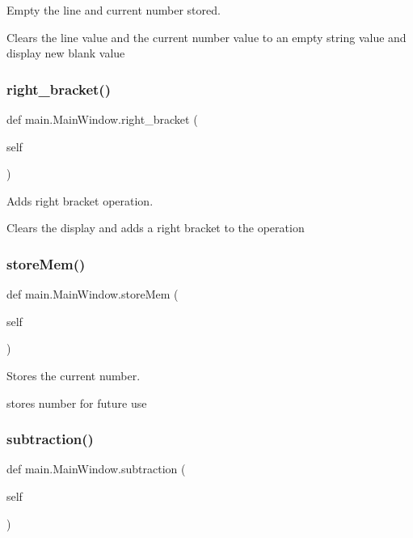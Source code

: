 Empty the line and current number stored. 

Clears the line value and the current number value to an empty string value and display new blank value \mbox{\label{classmain_1_1_main_window_a5685744d7001c36a299b5e7ce984cf92}} 
\subsubsection{\texorpdfstring{right\+\_\+bracket()}{right\_bracket()}}
{\footnotesize\ttfamily def main.\+Main\+Window.\+right\+\_\+bracket (\begin{DoxyParamCaption}\item[{}]{self }\end{DoxyParamCaption})}



Adds right bracket operation. 

Clears the display and adds a right bracket to the operation \mbox{\label{classmain_1_1_main_window_a0888a2f2c8cd534806ea385502f1a67b}} 
\subsubsection{\texorpdfstring{store\+Mem()}{storeMem()}}
{\footnotesize\ttfamily def main.\+Main\+Window.\+store\+Mem (\begin{DoxyParamCaption}\item[{}]{self }\end{DoxyParamCaption})}



Stores the current number. 

stores number for future use \mbox{\label{classmain_1_1_main_window_a11dbd9c961cc33a4fe1bb87226810bca}} 
\subsubsection{\texorpdfstring{subtraction()}{subtraction()}}
{\footnotesize\ttfamily def main.\+Main\+Window.\+subtraction (\begin{DoxyParamCaption}\item[{}]{self }\end{DoxyParamCaption})}



